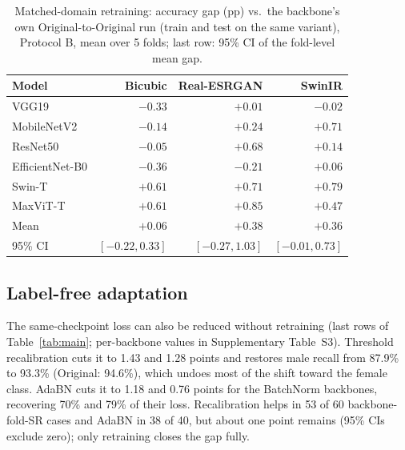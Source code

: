 \documentclass[conference]{IEEEtran}
\begin{document}
\begin{table}[t]
\centering
\caption{Matched-domain retraining: accuracy gap (pp) vs.\ the backbone's own Original-to-Original run (train and test on the same variant), Protocol B, mean over 5 folds; last row: 95\% CI of the fold-level mean gap.}
\label{tab:matched}
\small
\begin{tabular}{@{}lrrr@{}}
\toprule
Model & Bicubic & Real-ESRGAN & SwinIR \\
\midrule
VGG19            & $-0.33$ & $+0.01$ & $-0.02$ \\
MobileNetV2      & $-0.14$ & $+0.24$ & $+0.71$ \\
ResNet50         & $-0.05$ & $+0.68$ & $+0.14$ \\
EfficientNet-B0  & $-0.36$ & $-0.21$ & $+0.06$ \\
Swin-T           & $+0.61$ & $+0.71$ & $+0.79$ \\
MaxViT-T         & $+0.61$ & $+0.85$ & $+0.47$ \\
\midrule
Mean & $+0.06$ & $+0.38$ & $+0.36$ \\
95\% CI & $[-0.22, 0.33]$ & $[-0.27, 1.03]$ & $[-0.01, 0.73]$ \\
\bottomrule
\end{tabular}
\end{table}

\subsection{Label-free adaptation}\label{sec:adapt}
The same-checkpoint loss can also be reduced without retraining (last rows of Table~\ref{tab:main}; per-backbone values in Supplementary Table~S3). Threshold recalibration cuts it to 1.43 and 1.28 points and restores male recall from 87.9\% to 93.3\% (Original: 94.6\%), which undoes most of the shift toward the female class. AdaBN cuts it to 1.18 and 0.76 points for the BatchNorm backbones, recovering 70\% and 79\% of their loss. Recalibration helps in 53 of 60 backbone-fold-SR cases and AdaBN in 38 of 40, but about one point remains (95\% CIs exclude zero); only retraining closes the gap fully.
\end{document}
